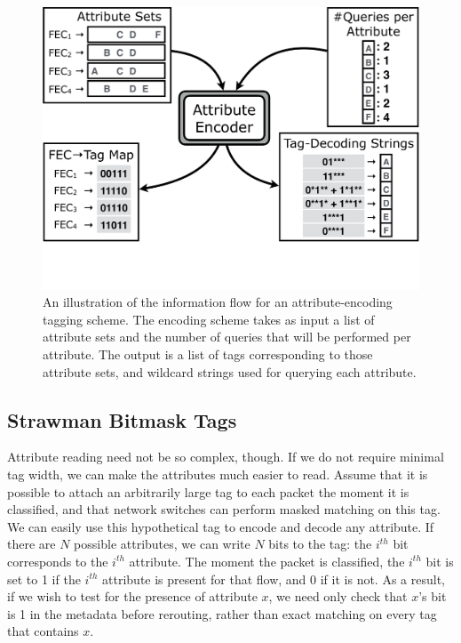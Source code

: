 \begin{figure}[t!] 
\begin{minipage}{1\linewidth}
\includegraphics[trim={0 4cm 0 0}, clip, width=\linewidth]{figures/system_flow2}
\end{minipage} 
\caption{An illustration of the information flow for an attribute-encoding tagging scheme. The encoding scheme takes as input a list of attribute sets and the number of queries that will be performed per attribute. The output is a list of tags corresponding to those attribute sets, and wildcard strings used for querying each attribute.}
\label{fig:system_flow}
\end{figure}


\subsection{Strawman Bitmask Tags}

Attribute reading need not be so complex, though. If we do not require minimal tag width, we can make the attributes much easier to read.
Assume that it is possible to attach an arbitrarily
large tag to each packet the moment it is classified, and that network switches
can perform masked matching on this tag.
We can easily use this hypothetical tag to encode and decode 
any attribute. If there are $N$ possible attributes, we can write $N$ bits to
the tag: the $i^{th}$ bit corresponds to the $i^{th}$ attribute. The moment
the packet is classified, the $i^{th}$ bit is set to 1 if the $i^{th}$ attribute
is present for that flow, and 0 if it is not. As a result, if we wish to test for
the presence of attribute $x$, we need only check that $x$'s bit is 1 in the
metadata before rerouting, rather than exact matching on every tag that contains
$x$.


